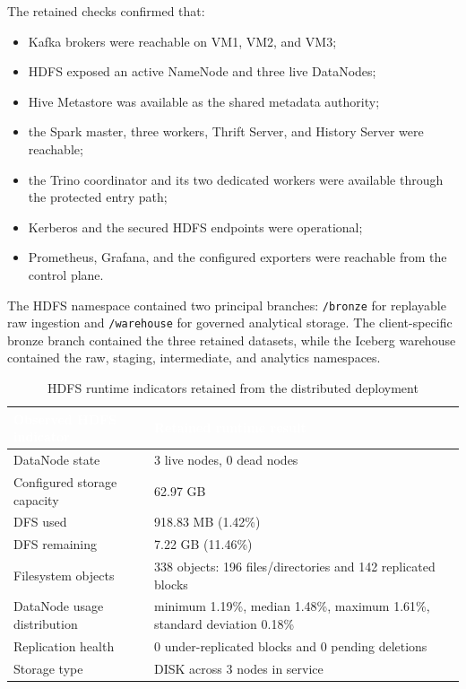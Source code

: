 The retained checks confirmed that:
\begin{itemize}
    \item Kafka brokers were reachable on VM1, VM2, and VM3;
    \item HDFS exposed an active NameNode and three live DataNodes;
    \item Hive Metastore was available as the shared metadata authority;
    \item the Spark master, three workers, Thrift Server, and History Server were reachable;
    \item the Trino coordinator and its two dedicated workers were available through the protected entry path;
    \item Kerberos and the secured HDFS endpoints were operational;
    \item Prometheus, Grafana, and the configured exporters were reachable from the control plane.
\end{itemize}

The HDFS namespace contained two principal branches: \texttt{/bronze} for replayable raw ingestion and \texttt{/warehouse} for governed analytical storage. The client-specific bronze branch contained the three retained datasets, while the Iceberg warehouse contained the raw, staging, intermediate, and analytics namespaces.

\begin{table}[!htbp]
    \centering
    \footnotesize
    \renewcommand{\arraystretch}{1.14}
    \begin{tabularx}{\textwidth}{|L{0.39\textwidth}|Y|}
        \hline
        \textcolor{white}{\textbf{Observed HDFS indicator}} & \textcolor{white}{\textbf{Retained runtime result}} \\
        \hline
        DataNode state & 3 live nodes, 0 dead nodes \\
        \hline
        Configured storage capacity & 62.97 GB \\
        \hline
        DFS used & 918.83 MB (1.42\%) \\
        \hline
        DFS remaining & 7.22 GB (11.46\%) \\
        \hline
        Filesystem objects & 338 objects: 196 files/directories and 142 replicated blocks \\
        \hline
        DataNode usage distribution & minimum 1.19\%, median 1.48\%, maximum 1.61\%, standard deviation 0.18\% \\
        \hline
        Replication health & 0 under-replicated blocks and 0 pending deletions \\
        \hline
        Storage type & DISK across 3 nodes in service \\
        \hline
    \end{tabularx}
    \caption{HDFS runtime indicators retained from the distributed deployment}
    \label{tab:chapter8-hdfs-runtime-evidence}
\end{table}

